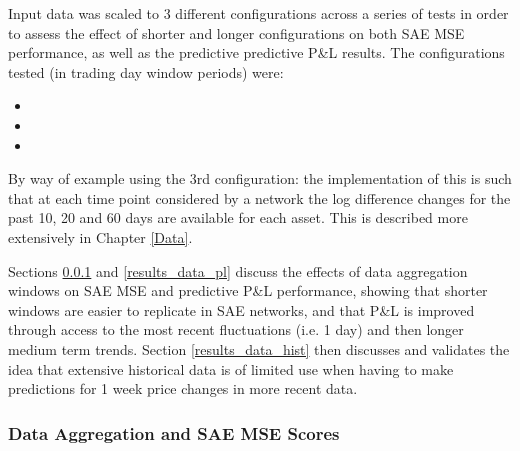 \documentclass[a4paper,11pt,oneside]{article}
\theoremstyle{plain}
\theoremstyle{definition}
\begin{document}
Input data was scaled to 3 different configurations across a series of tests in order to assess the effect of shorter and longer configurations on both SAE MSE performance, as well as the predictive predictive P\&L results. The configurations tested (in trading day window periods) were:

\begin{itemize}
	\item[1.] [1, 5, 20]
	\item[2.] [5, 20, 60]
	\item[3.] [10, 20, 60]
\end{itemize}

By way of example using the 3rd configuration: the implementation of this is such that at each time point considered by a network the log difference changes for the past 10, 20 and 60 days are available for each asset. This is described more extensively in Chapter \ref{Data}.\newline

Sections \ref{results_data_mse} and \ref{results_data_pl} discuss the effects of data aggregation windows on SAE MSE and predictive P\&L performance, showing that shorter windows are easier to replicate in SAE networks, and that P\&L is improved through access to the most recent fluctuations (i.e. 1 day) and then longer medium term trends. Section \ref{results_data_hist} then discusses and validates the idea that extensive historical data is of limited use when having to make predictions for 1 week price changes in more recent data.

\subsubsection{Data Aggregation and SAE MSE Scores}\label{results_data_mse}
\end{document}
